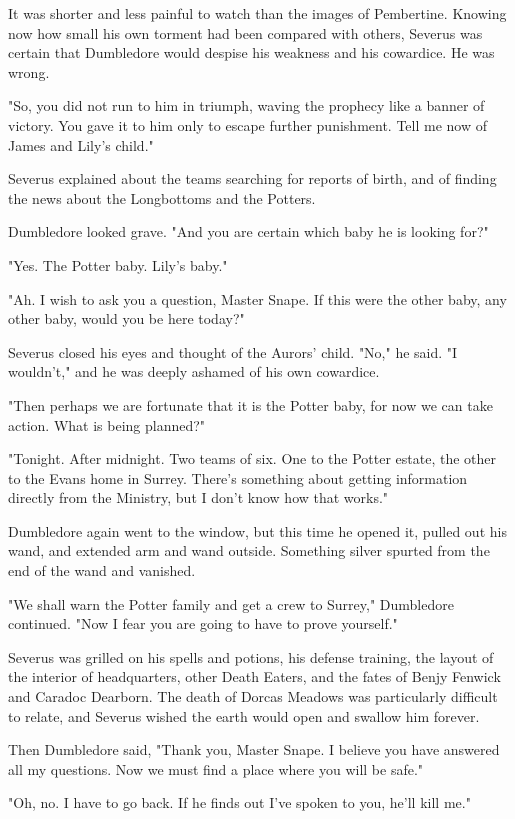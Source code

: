 \documentclass[a4paper,11pt]{article}
\begin{document}
It was shorter and less painful to watch than the images of Pembertine. Knowing now how small his own torment had been compared with others, Severus was certain that Dumbledore would despise his weakness and his cowardice. He was wrong.

"So, you did not run to him in triumph, waving the prophecy like a banner of victory. You gave it to him only to escape further punishment. Tell me now of James and Lily's child."

Severus explained about the teams searching for reports of birth, and of finding the news about the Longbottoms and the Potters.

Dumbledore looked grave. "And you are certain which baby he is looking for?"

"Yes. The Potter baby. Lily's baby."

"Ah. I wish to ask you a question, Master Snape. If this were the other baby, any other baby, would you be here today?"

Severus closed his eyes and thought of the Aurors' child. "No," he said. "I wouldn't," and he was deeply ashamed of his own cowardice.

"Then perhaps we are fortunate that it is the Potter baby, for now we can take action. What is being planned?"

"Tonight. After midnight. Two teams of six. One to the Potter estate, the other to the Evans home in Surrey. There's something about getting information directly from the Ministry, but I don't know how that works."

Dumbledore again went to the window, but this time he opened it, pulled out his wand, and extended arm and wand outside. Something silver spurted from the end of the wand and vanished.

"We shall warn the Potter family and get a crew to Surrey," Dumbledore continued. "Now I fear you are going to have to prove yourself."

Severus was grilled on his spells and potions, his defense training, the layout of the interior of headquarters, other Death Eaters, and the fates of Benjy Fenwick and Caradoc Dearborn. The death of Dorcas Meadows was particularly difficult to relate, and Severus wished the earth would open and swallow him forever.

Then Dumbledore said, "Thank you, Master Snape. I believe you have answered all my questions. Now we must find a place where you will be safe."

"Oh, no. I have to go back. If he finds out I've spoken to you, he'll kill me."
\end{document}
